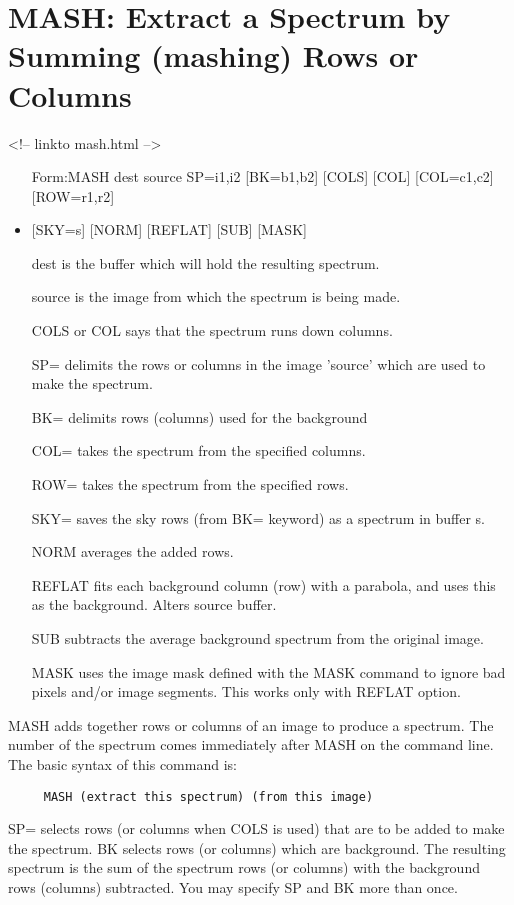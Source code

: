 \section{MASH: Extract a Spectrum by Summing (mashing) Rows or Columns}
\begin{rawhtml}
<!-- linkto mash.html -->
\end{rawhtml}
\begin{itemize}
  \item[Form:MASH dest source SP=i1,i2 {[BK=b1,b2]} {[COLS]} {[COL]} 
       {[COL=c1,c2]} {[ROW=r1,r2]}\hfill]{}
  \item{{[SKY=s]} {[NORM]} {[REFLAT]} {[SUB]} {[MASK]}}
  \item[dest\hfill]{is the buffer which will hold the resulting spectrum.}
  \item[source\hfill]{is the image from which the spectrum is being made.}
  \item[COLS or COL\hfill]{says that the spectrum runs down columns.}
  \item[SP=\hfill]{delimits the rows or columns in the image 
        'source' which are used to make the spectrum.}
  \item[BK=\hfill]{delimits rows (columns) used for the background}
  \item[COL=\hfill]{takes the spectrum from the specified columns.}
  \item[ROW=\hfill]{takes the spectrum from the specified rows.}
  \item[SKY=\hfill]{saves the sky rows (from BK= keyword) as a
        spectrum in buffer s.}
  \item[NORM\hfill]{averages the added rows.}
  \item[REFLAT\hfill]{fits each background column (row) with a parabola, 
        and uses this as the background.  Alters source buffer.}
  \item[SUB\hfill]{subtracts the average background spectrum from
        the original image.}
  \item[MASK\hfill]{uses the image mask defined with the MASK
       command to ignore bad pixels and/or image}
       segments.  This works only with REFLAT option.
\end{itemize}

MASH adds together rows or columns of an image to produce a spectrum. The
number of the spectrum comes immediately after MASH on the command
line. The basic syntax of this command is:
\begin{verbatim}
     MASH (extract this spectrum) (from this image)
\end{verbatim}
SP= selects rows (or columns when COLS is used) that are to be added to
make the spectrum.  BK selects rows (or columns) which are background.  The
resulting spectrum is the sum of the spectrum rows (or columns) with the
background rows (columns) subtracted. You may specify SP and BK more than
once.


